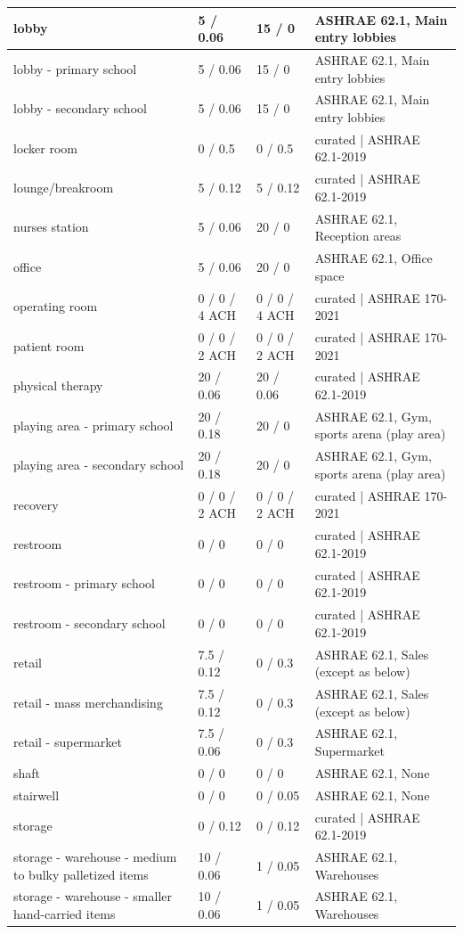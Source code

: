 \begin{center}
\begin{longtable}{|p{2.1in}|p{1.05in}|p{1.05in}|p{2.1in}|}
lobby & 5 / 0.06 & 15 / 0 & ASHRAE 62.1, Main entry lobbies \\ \hline
lobby - primary school & 5 / 0.06 & 15 / 0 & ASHRAE 62.1, Main entry lobbies \\ \hline
lobby - secondary school & 5 / 0.06 & 15 / 0 & ASHRAE 62.1, Main entry lobbies \\ \hline
locker room & 0 / 0.5 & 0 / 0.5 & curated | ASHRAE 62.1-2019 \\ \hline
lounge/breakroom & 5 / 0.12 & 5 / 0.12 & curated | ASHRAE 62.1-2019 \\ \hline
nurses station & 5 / 0.06 & 20 / 0 & ASHRAE 62.1, Reception areas \\ \hline
office & 5 / 0.06 & 20 / 0 & ASHRAE 62.1, Office space \\ \hline
operating room & 0 / 0 / 4 ACH & 0 / 0 / 4 ACH & curated | ASHRAE 170-2021 \\ \hline
patient room & 0 / 0 / 2 ACH & 0 / 0 / 2 ACH & curated | ASHRAE 170-2021 \\ \hline
physical therapy & 20 / 0.06 & 20 / 0.06 & curated | ASHRAE 62.1-2019 \\ \hline
playing area - primary school & 20 / 0.18 & 20 / 0 & ASHRAE 62.1, Gym, sports arena (play area) \\ \hline
playing area - secondary school & 20 / 0.18 & 20 / 0 & ASHRAE 62.1, Gym, sports arena (play area) \\ \hline
recovery & 0 / 0 / 2 ACH & 0 / 0 / 2 ACH & curated | ASHRAE 170-2021 \\ \hline
restroom & 0 / 0 & 0 / 0 & curated | ASHRAE 62.1-2019 \\ \hline
restroom - primary school & 0 / 0 & 0 / 0 & curated | ASHRAE 62.1-2019 \\ \hline
restroom - secondary school & 0 / 0 & 0 / 0 & curated | ASHRAE 62.1-2019 \\ \hline
retail & 7.5 / 0.12 & 0 / 0.3 & ASHRAE 62.1, Sales (except as below) \\ \hline
retail - mass merchandising & 7.5 / 0.12 & 0 / 0.3 & ASHRAE 62.1, Sales (except as below) \\ \hline
retail - supermarket & 7.5 / 0.06 & 0 / 0.3 & ASHRAE 62.1, Supermarket \\ \hline
shaft & 0 / 0 & 0 / 0 & ASHRAE 62.1, None \\ \hline
stairwell & 0 / 0 & 0 / 0.05 & ASHRAE 62.1, None \\ \hline
storage & 0 / 0.12 & 0 / 0.12 & curated | ASHRAE 62.1-2019 \\ \hline
storage - warehouse - medium to bulky palletized items & 10 / 0.06 & 1 / 0.05 & ASHRAE 62.1, Warehouses \\ \hline
storage - warehouse - smaller hand-carried items & 10 / 0.06 & 1 / 0.05 & ASHRAE 62.1, Warehouses \\ \hline
\end{longtable}
\end{center}
